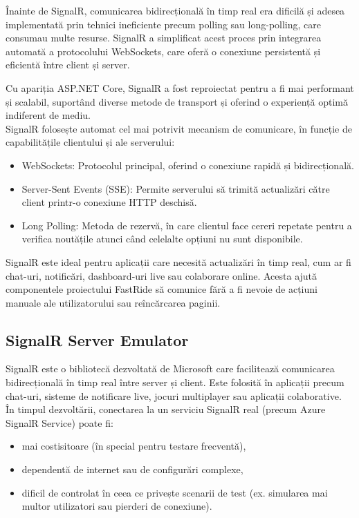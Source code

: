 Înainte de SignalR, comunicarea bidirecțională în timp real era dificilă și adesea implementată prin tehnici ineficiente precum polling sau long-polling, care consumau multe resurse. SignalR a simplificat acest proces prin integrarea automată a protocolului WebSockets, care oferă o conexiune persistentă și eficientă între client și server. \parencite{signalR}

Cu apariția ASP.NET Core, SignalR a fost reproiectat pentru a fi mai performant și scalabil, suportând diverse metode de transport și oferind o experiență optimă indiferent de mediu. \parencite{signalR}
\\SignalR folosește automat cel mai potrivit mecanism de comunicare, în funcție de capabilitățile clientului și ale serverului:
\begin{itemize}
    \item WebSockets: Protocolul principal, oferind o conexiune rapidă și bidirecțională.
    \item Server-Sent Events (SSE): Permite serverului să trimită actualizări către client printr-o conexiune HTTP deschisă.
    \item Long Polling: Metoda de rezervă, în care clientul face cereri repetate pentru a verifica noutățile atunci când celelalte opțiuni nu sunt disponibile.
\end{itemize}\parencite{signalR}

SignalR este ideal pentru aplicații care necesită actualizări în timp real, cum ar fi chat-uri, notificări, dashboard-uri live sau colaborare online.
Acesta ajută componentele proiectului FastRide să comunice fără a fi nevoie de acțiuni manuale ale utilizatorului sau reîncărcarea paginii.

\subsection{SignalR Server Emulator}

SignalR este o bibliotecă dezvoltată de Microsoft care facilitează comunicarea bidirecțională în timp real între server și client. Este folosită în aplicații precum chat-uri, sisteme de notificare live, jocuri multiplayer sau aplicații colaborative.
\parencite{signalREmulator}
\\În timpul dezvoltării, conectarea la un serviciu SignalR real (precum Azure SignalR Service) poate fi:
\begin{itemize}
    \item mai costisitoare (în special pentru testare frecventă),
    \item dependentă de internet sau de configurări complexe,
    \item dificil de controlat în ceea ce privește scenarii de test (ex. simularea mai multor utilizatori sau pierderi de conexiune).
\end{itemize}
\parencite{signalREmulator}

